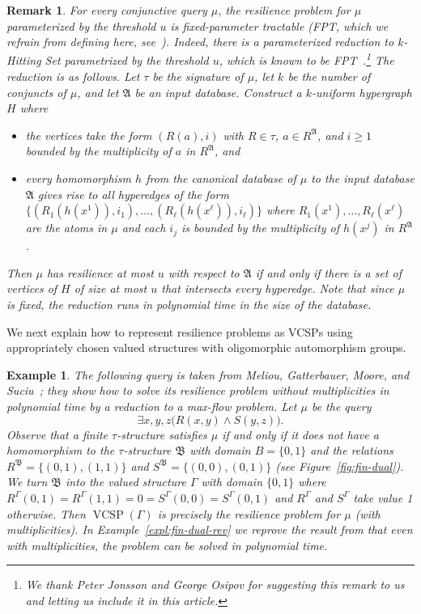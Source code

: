 \documentclass[nonacm]{acmart}
\newcommand{\bA}{{\mathfrak A}}
\newcommand{\bB}{{\mathfrak B}}
\DeclareMathOperator{\VCSP}{VCSP}
\newtheorem{expl}[theorem]{Example}
\newtheorem{remark}[theorem]{Remark}
\begin{document}
\begin{remark}
For every conjunctive query $\mu$, the resilience problem for $\mu$ parameterized by the threshold $u$ is fixed-parameter tractable (FPT, which we  refrain from defining here, see~\cite{ParametrizedAlgorithmsBook}). Indeed, there is
a parameterized reduction to $k$-Hitting Set parametrized by the threshold $u$, which is known to be FPT~\cite{ParametrizedAlgorithmsBook}.\footnote{We thank Peter Jonsson and George Osipov for suggesting this remark to us and letting us include it in this article.} The reduction is as follows. Let $\tau$ be the signature of $\mu$, let $k$ be the number of conjuncts of $\mu$, and let $\bA$ be an input database. Construct a $k$-uniform hypergraph $H$ where 
%
\begin{itemize}

\item
the vertices take the form $(R(a), i)$ with $R \in \tau$, $a \in R^{\bA}$, and $i \geq 1$ bounded by the multiplicity of $a$ in $R^{\bA}$,  and
\item every homomorphism $h$ from the canonical database of $\mu$ to the input database $\bA$ gives rise to
all hyperedges of the form $\{ (R_1(h(x^1)),i_1),\dots,(R_\ell(h(x^\ell)),i_\ell)\}$ where $R_1(x^1),\dots,R_\ell(x^\ell)$ are the atoms in $\mu$ and 
each $i_j$ is bounded by the multiplicity of $h(x^j)$ in $R^\bA$.
\end{itemize}
%
 Then $\mu$ has resilience at most $u$ with respect to $\bA$ if and only if there is a set of vertices of $H$ of size at most $u$ that intersects every hyperedge. 
Note that since $\mu$ is fixed, the reduction runs in polynomial time in the size of the database. 
\end{remark}

We next explain how to represent resilience problems as VCSPs using appropriately chosen valued structures with oligomorphic automorphism groups.

\begin{expl}\label{expl:fin-dual}
The following query is taken from Meliou, Gatterbauer, Moore, and Suciu~\cite{Meliou2010}; they show how to solve its resilience problem without multiplicities in polynomial time by a reduction to a max-flow problem.  
Let $\mu$ be the query $$\exists x,y,z \big ( R(x,y) \wedge S(y,z) \big ).$$
 Observe that a finite $\tau$-structure
 satisfies $\mu$ if and only if it does not have a homomorphism to the $\tau$-structure $\bB$
with domain $B = \{0,1\}$ and the relations
$R^{\bB} = \{(0,1),(1,1)\}$ and $S^{\bB} = \{(0,0),(0,1)\}$ (see Figure~\ref{fig:fin-dual}). We turn $\bB$ into the valued structure $\Gamma$ with domain $\{0,1\}$ where $R^{\Gamma}(0,1) = R^{\Gamma}(1,1) = 0 = S^{\Gamma}(0,0) = S^{\Gamma}(0,1)$ and $R^{\Gamma}$ and $S^{\Gamma}$ take value 1 otherwise.
Then $\VCSP(\Gamma)$ is precisely the resilience problem for $\mu$ (with multiplicities).
In Example~\ref{expl:fin-dual-rev} we reprove the result from \cite{LatestResilience} 
that even with multiplicities, the problem can be solved in polynomial time.
\end{expl}
\end{document}
